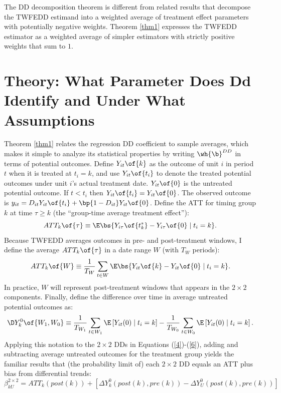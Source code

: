 \documentclass[12pt]{article}
\theoremstyle{definition}
\begin{document}
The DD decomposition theorem is different from related results that decompose the TWFEDD estimand into a weighted average of treatment effect parameters with potentially negative weights. Theorem \ref{thm1} expresses the TWFEDD estimator as a weighted average of simpler estimators with strictly positive weights that sum to $1$. 

\section{Theory: What Parameter Does Dd Identify and Under What Assumptions}

Theorem \ref{thm1} relates the regression DD coefficient to sample averages, which makes it simple to analyze its statistical properties by writing $\wh{\b}^{DD}$ in terms of potential outcomes. Define $Y_{it}\of{k}$ as the outcome of unit $i$ in period $t$ when it is treated at $t_i = k$, and use $Y_{it}\of{t_i}$ to denote the treated potential outcomes under unit $i$'s actual treatment date. $Y_{it}\of{0}$ is the untreated potential outcome. If $t < t_i$ then $Y_{it}\of{t_i} = Y_{it}\of{0}$. The observed outcome is $y_{it} = D_{it} Y_{it}\of{t_i} + \bp{1-D_{it}}Y_{it}\of{0}$. Define the ATT for timing group $k$ at time $\tau \geq k$ (the ``group-time average treatment effect''):
$$
ATT_{k}\of{\tau} \equiv \E\bs{Y_{i\tau}\of{t_k^*} - Y_{i\tau}\of{0} \mid t_i = k}. 
$$
Because TWFEDD averages outcomes in pre- and post-treatment windows, I define the average $ATT_k\of{\tau}$ in a date range $W$ (with $T_W$ periods):
\begin{equation}
    \label{12}
    ATT_k\of{W} \equiv \frac{1}{T_W} \sum_{t \in W} \E\bs{Y_{it}\of{k} - Y_{it}\of{0} \mid t_i = k}.
\end{equation}
In practice, $W$ will represent post-treatment windows that appears in the $2\times2$ components. Finally, define the difference over time in average untreated potential outcomes as:
\begin{equation}
    \label{13}
    \D Y_k^0\of{W_1, W_0} \equiv \frac{1}{T_{W_1}} \sum_{t \in W_1} \E\left[Y_{i t}(0) \mid t_i=k\right]-\frac{1}{T_{W_0}} \sum_{t \in W_0} \E\left[Y_{i t}(0) \mid t_i=k\right].
\end{equation}
Applying this notation to the $2\times2$ DDs in Equations (\ref{4})-(\ref{6}), adding and subtracting average untreated outcomes for the treatment group yields the familiar results that (the probability limit of) each $2\times 2$ DD equals an ATT plus bias from differential trends:
\begin{equation}
    \tag{14a} \label{14a}
    \beta_{k U}^{2 \times 2}= {ATT}_k({post}(k))+\left[\Delta Y_k^0({post}(k), {pre}(k))-\Delta Y_U^0({post}(k), {pre}(k))\right]
\end{equation}
\end{document}
